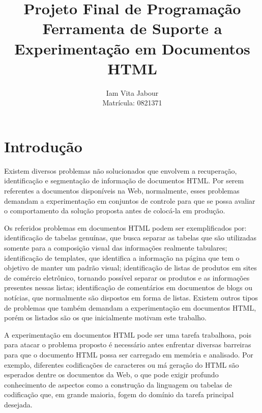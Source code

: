 \documentclass[12pt, a4paper]{article}
\begin{document}
\title{{\bf Projeto Final de Programação} \\ \bigskip Ferramenta de Suporte a Experimentação em Documentos HTML}
\author{Iam Vita Jabour \\ Matrícula: 0821371}
\maketitle


\section{Introdução}


Existem diversos problemas não solucionados que envolvem a
recuperação, identificação e segmentação de 
informação de documentos HTML. Por serem referentes a documentos disponíveis
na Web, normalmente, esses problemas demandam a
experimentação em conjuntos de controle para que se possa avaliar o
comportamento da solução proposta antes de colocá-la em produção.

Os referidos problemas em documentos HTML podem ser exemplificados
por: identificação de tabelas genuínas, que busca separar as tabelas que
são utilizadas somente para a composição visual das informações
realmente tabulares; identificação de templates, que identifica a
informação na página que tem o objetivo de manter um padrão visual;
identificação de listas de produtos em sites de comércio eletrônico,
tornando possível separar os produtos e as informações presentes nessas
listas; identificação de comentários em documentos de blogs ou notícias,
que normalmente são dispostos em forma de listas. Existem outros tipos
de problemas que também demandam a experimentação em documentos HTML,
porém os listados são os que inicialmente motivam este trabalho.


A experimentação em documentos HTML pode ser uma tarefa trabalhosa, pois
para atacar o problema proposto é necessário antes enfrentar diversas
barreiras para que o documento HTML possa ser carregado em memória e
analisado. Por exemplo, diferentes codificações de caracteres ou má geração do
HTML são esperados dentre os documentos da Web, o que pode 
exigir profundo conhecimento de aspectos como a construção da linguagem ou
tabelas de codificação que, em grande maioria, fogem do domínio da tarefa
principal desejada.
\end{document}
